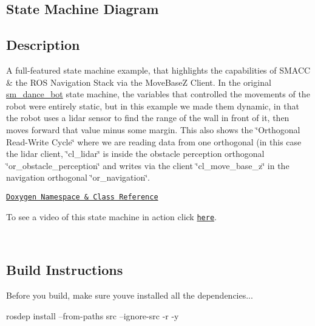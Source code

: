 \subsection*{State Machine Diagram}



\subsection*{Description}

A full-\/featured state machine example, that highlights the capabilities of S\+M\+A\+CC \& the R\+OS Navigation Stack via the Move\+BaseZ Client. In the original \hyperlink{namespacesm__dance__bot}{sm\+\_\+dance\+\_\+bot} state machine, the variables that controlled the movements of the robot were entirely static, but in this example we made them dynamic, in that the robot uses a lidar sensor to find the range of the wall in front of it, then moves forward that value minus some margin. This also shows the \char`\"{}\+Orthogonal Read-\/\+Write Cycle\char`\"{} where we are reading data from one orthogonal (in this case the lidar client, \char`\"{}cl\+\_\+lidar\char`\"{} is inside the obstacle perception orthogonal \char`\"{}or\+\_\+obstacle\+\_\+perception\char`\"{} and writes via the client \char`\"{}cl\+\_\+move\+\_\+base\+\_\+z\char`\"{} in the navigation orthogonal \char`\"{}or\+\_\+navigation\char`\"{}.~\newline


\href{https://reelrbtx.github.io/SMACC_Documentation/master/html/namespacesm__dance__bot__strikes__back.html}{\tt Doxygen Namespace \& Class Reference}

To see a video of this state machine in action click \href{https://www.youtube.com/watch?v=ucMr5Dg6UpU}{\tt here}. ~\newline


 

~\newline


\subsection*{Build Instructions}

Before you build, make sure you\textquotesingle{}ve installed all the dependencies...


\begin{DoxyCode}
rosdep install --from-paths src --ignore-src -r -y 
\end{DoxyCode}



